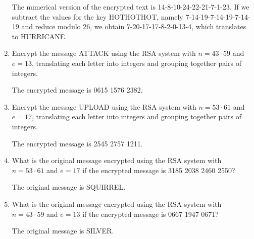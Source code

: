 \documentclass[11pt]{article}
\begin{document}
\begin{enumerate}[label=\textbf{\arabic*.}]
	The numerical version of the encrypted text is 14-8-10-24-22-21-7-1-23. If we subtract the values for the key HOTHOTHOT, namely 7-14-19-7-14-19-7-14-19 and reduce modulo 26, we obtain 7-20-17-17-8-2-0-13-4, which translates to HURRICANE.
	
	\item Encrypt the message ATTACK using the RSA system with $n = 43 \cdot 59$ and $e = 13$, translating each letter into integers and grouping together pairs of integers.
	
	The encrypted message is 0615 1576 2382.
	
	\item Encrypt the message UPLOAD using the RSA system with $n = 53 \cdot 61$ and $e = 17$, translating each letter into integers and grouping together pairs of integers.
	
	The encrypted message is 2545 2757 1211.
	
	\item What is the original message encrypted using the RSA system with $n = 53 \cdot 61$ and $e = 17$ if the encrypted message is 3185 2038 2460 2550?
	
	The original message is SQUIRREL.
	
	\item What is the original message encrypted using the RSA system with $n = 43 \cdot 59$ and $e = 13$ if the encrypted message is 0667 1947 0671?
	
	The original message is SILVER.
\end{enumerate}
\end{document}
